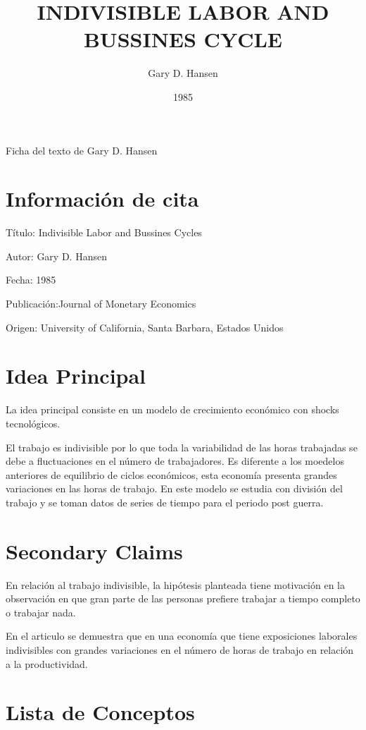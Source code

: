 \documentclass{article}
\title{INDIVISIBLE LABOR AND BUSSINES CYCLE}
\author{Gary D. Hansen}
\date{1985}
\begin{document}
\maketitle

Ficha del texto de Gary D. Hansen

\section{Información de cita}


Título: Indivisible Labor and Bussines Cycles


Autor: Gary D. Hansen

Fecha: 1985

Publicación:Journal of Monetary Economics

Origen: University of California, Santa Barbara, Estados Unidos

\section{Idea Principal}

La idea principal consiste en un modelo de  crecimiento económico con shocks tecnológicos.

El trabajo es indivisible por lo que toda la variabilidad de las horas trabajadas se debe a fluctuaciones en el número de trabajadores. Es diferente a los moedelos anteriores de equilibrio de ciclos económicos, esta economía presenta grandes variaciones en las horas de trabajo. En este modelo se estudia con división del trabajo y se toman datos de series de tiempo para el periodo post guerra. 


\section{Secondary Claims}

En relación al trabajo indivisible, la hipótesis planteada tiene motivación en la observación en que gran parte de las personas prefiere trabajar a tiempo completo o trabajar nada.




En el articulo se demuestra  que en una economía que tiene exposiciones laborales indivisibles con grandes variaciones en el número de horas de trabajo en relación a la productividad.

\section{Lista de Conceptos}
\end{document}
